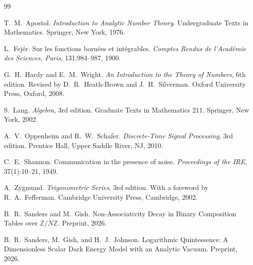 \documentclass[11pt,reqno]{amsart}
\theoremstyle{plain}
\theoremstyle{definition}
\theoremstyle{remark}
\begin{document}
\begin{thebibliography}{99}

T.~M.~Apostol.
\newblock \emph{Introduction to Analytic Number Theory}.
\newblock Undergraduate Texts in Mathematics. Springer, New York, 1976.

L.~Fej\'{e}r.
\newblock Sur les fonctions born\'{e}es et int\'{e}grables.
\newblock \emph{Comptes Rendus de l'Acad\'{e}mie des Sciences, Paris},
131:984--987, 1900.

G.~H.~Hardy and E.~M.~Wright.
\newblock \emph{An Introduction to the Theory of Numbers}, 6th edition.
\newblock Revised by D.~R.~Heath-Brown and J.~H.~Silverman.
\newblock Oxford University Press, Oxford, 2008.

S.~Lang.
\newblock \emph{Algebra}, 3rd edition.
\newblock Graduate Texts in Mathematics 211. Springer, New York, 2002.

A.~V.~Oppenheim and R.~W.~Schafer.
\newblock \emph{Discrete-Time Signal Processing}, 3rd edition.
\newblock Prentice Hall, Upper Saddle River, NJ, 2010.

C.~E.~Shannon.
\newblock Communication in the presence of noise.
\newblock \emph{Proceedings of the IRE}, 37(1):10--21, 1949.

A.~Zygmund.
\newblock \emph{Trigonometric Series}, 3rd edition.
\newblock With a foreword by R.~A.~Fefferman.
Cambridge University Press, Cambridge, 2002.

B.~R.~Sanders and M.~Gish.
\newblock Non-Associativity Decay in Binary Composition Tables over
$\mathbb{Z}/N\mathbb{Z}$.
\newblock Preprint, 2026.

B.~R.~Sanders, M.~Gish, and H.~J.~Johnson.
\newblock Logarithmic Quintessence: A Dimensionless Scalar Dark Energy
Model with an Analytic Vacuum.
\newblock Preprint, 2026.

\end{thebibliography}
\end{document}
